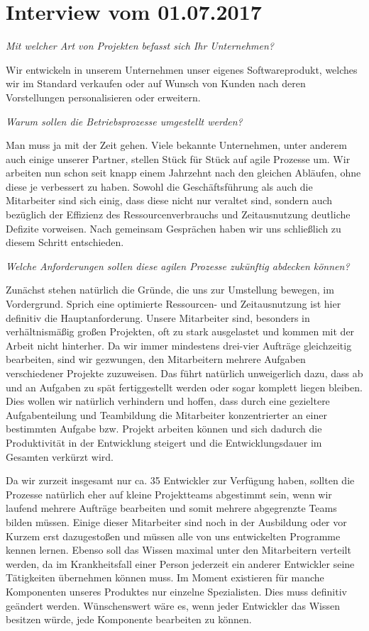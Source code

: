 \section*{Interview vom 01.07.2017}
\textit{Mit welcher Art von Projekten befasst sich Ihr Unternehmen?}

Wir entwickeln in unserem Unternehmen unser eigenes Softwareprodukt, welches wir im Standard verkaufen oder auf Wunsch von Kunden nach deren Vorstellungen personalisieren oder erweitern.

\textit{Warum sollen die Betriebsprozesse umgestellt werden?}

Man muss ja mit der Zeit gehen. Viele bekannte Unternehmen, unter anderem auch einige unserer Partner, stellen Stück für Stück auf agile Prozesse um. Wir arbeiten nun schon seit knapp einem Jahrzehnt nach den gleichen Abläufen, ohne diese je verbessert zu haben. Sowohl die Geschäftsführung als auch die Mitarbeiter sind sich einig, dass diese nicht nur veraltet sind, sondern auch bezüglich der Effizienz des Ressourcenverbrauchs und Zeitausnutzung deutliche Defizite vorweisen. Nach gemeinsam Gesprächen haben wir uns schließlich zu diesem Schritt entschieden.

\textit{Welche Anforderungen sollen diese agilen Prozesse zukünftig abdecken können?}

Zunächst stehen natürlich die Gründe, die uns zur Umstellung bewegen, im Vordergrund. Sprich eine optimierte Ressourcen- und Zeitausnutzung ist hier definitiv die Hauptanforderung. Unsere Mitarbeiter sind, besonders in verhältnismäßig großen Projekten, oft zu stark ausgelastet und kommen mit der Arbeit nicht hinterher. Da wir immer mindestens drei-vier Aufträge gleichzeitig bearbeiten, sind wir gezwungen, den Mitarbeitern mehrere Aufgaben verschiedener Projekte zuzuweisen. Das führt natürlich unweigerlich dazu, dass ab und an Aufgaben zu spät fertiggestellt werden oder sogar komplett liegen bleiben. Dies wollen wir natürlich verhindern und hoffen, dass durch eine gezieltere Aufgabenteilung und Teambildung die Mitarbeiter konzentrierter an einer bestimmten Aufgabe bzw. Projekt arbeiten können und sich dadurch die Produktivität in der Entwicklung steigert und die Entwicklungsdauer im Gesamten verkürzt wird.

Da wir zurzeit insgesamt nur ca. 35 Entwickler zur Verfügung haben, sollten die Prozesse natürlich eher auf kleine Projektteams abgestimmt sein, wenn wir laufend mehrere Aufträge bearbeiten und somit mehrere abgegrenzte Teams bilden müssen. Einige dieser Mitarbeiter sind noch in der Ausbildung oder vor Kurzem erst dazugestoßen und müssen alle von uns entwickelten Programme kennen lernen. Ebenso soll das Wissen maximal unter den Mitarbeitern verteilt werden, da im Krankheitsfall einer Person jederzeit ein anderer Entwickler seine Tätigkeiten übernehmen können muss. Im Moment existieren für manche Komponenten unseres Produktes nur einzelne Spezialisten. Dies muss definitiv geändert werden. Wünschenswert wäre es, wenn jeder Entwickler das Wissen besitzen würde, jede Komponente bearbeiten zu können.

